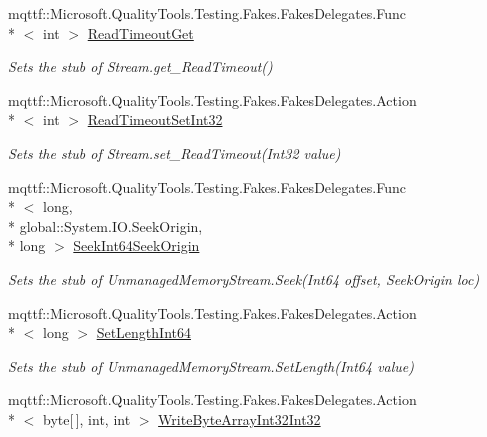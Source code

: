 \begin{DoxyCompactItemize}
mqttf\-::\-Microsoft.\-Quality\-Tools.\-Testing.\-Fakes.\-Fakes\-Delegates.\-Func\\*
$<$ int $>$ \hyperlink{class_system_1_1_i_o_1_1_fakes_1_1_stub_unmanaged_memory_stream_a1ed354c6cd3a52ecd363cc880219b6f6}{Read\-Timeout\-Get}
\begin{DoxyCompactList}\small\item\em Sets the stub of Stream.\-get\-\_\-\-Read\-Timeout()\end{DoxyCompactList}\item 
mqttf\-::\-Microsoft.\-Quality\-Tools.\-Testing.\-Fakes.\-Fakes\-Delegates.\-Action\\*
$<$ int $>$ \hyperlink{class_system_1_1_i_o_1_1_fakes_1_1_stub_unmanaged_memory_stream_a6ac0528dc3fd07f63b25965132229dd6}{Read\-Timeout\-Set\-Int32}
\begin{DoxyCompactList}\small\item\em Sets the stub of Stream.\-set\-\_\-\-Read\-Timeout(\-Int32 value)\end{DoxyCompactList}\item 
mqttf\-::\-Microsoft.\-Quality\-Tools.\-Testing.\-Fakes.\-Fakes\-Delegates.\-Func\\*
$<$ long, \\*
global\-::\-System.\-I\-O.\-Seek\-Origin, \\*
long $>$ \hyperlink{class_system_1_1_i_o_1_1_fakes_1_1_stub_unmanaged_memory_stream_ab7f0c2671bb705ce761e375bec063ff0}{Seek\-Int64\-Seek\-Origin}
\begin{DoxyCompactList}\small\item\em Sets the stub of Unmanaged\-Memory\-Stream.\-Seek(\-Int64 offset, Seek\-Origin loc)\end{DoxyCompactList}\item 
mqttf\-::\-Microsoft.\-Quality\-Tools.\-Testing.\-Fakes.\-Fakes\-Delegates.\-Action\\*
$<$ long $>$ \hyperlink{class_system_1_1_i_o_1_1_fakes_1_1_stub_unmanaged_memory_stream_a74eb68d4c14f4f5be874b4beb91ee676}{Set\-Length\-Int64}
\begin{DoxyCompactList}\small\item\em Sets the stub of Unmanaged\-Memory\-Stream.\-Set\-Length(\-Int64 value)\end{DoxyCompactList}\item 
mqttf\-::\-Microsoft.\-Quality\-Tools.\-Testing.\-Fakes.\-Fakes\-Delegates.\-Action\\*
$<$ byte\mbox{[}$\,$\mbox{]}, int, int $>$ \hyperlink{class_system_1_1_i_o_1_1_fakes_1_1_stub_unmanaged_memory_stream_ad54b64860c6a2b9d8c36f7d1fb5ec5e9}{Write\-Byte\-Array\-Int32\-Int32}

\end{DoxyCompactItemize}
